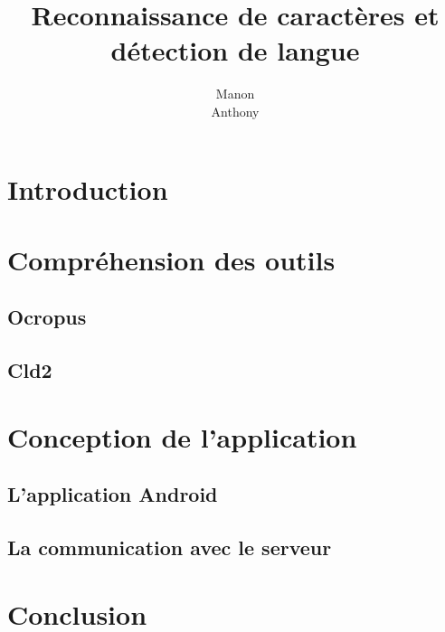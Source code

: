 \documentclass[12pt,titlepage,a4paper]{report}
\title{Reconnaissance de caractères et détection de langue}
\author{Manon \bsc{Ansart}\\ Anthony \bsc{Courtin}}
\begin{document}

	\dominitoc
	\tableofcontents

	\chapter{Introduction}
		

	\chapter{Compréhension des outils}
		\section{Ocropus}
			

		\section{Cld2}
			

	\chapter{Conception de l'application}
		\section{L'application Android}
			

		\section{La communication avec le serveur}
			

	\chapter{Conclusion}
		
		\citation{}

	
	
\end{document}
